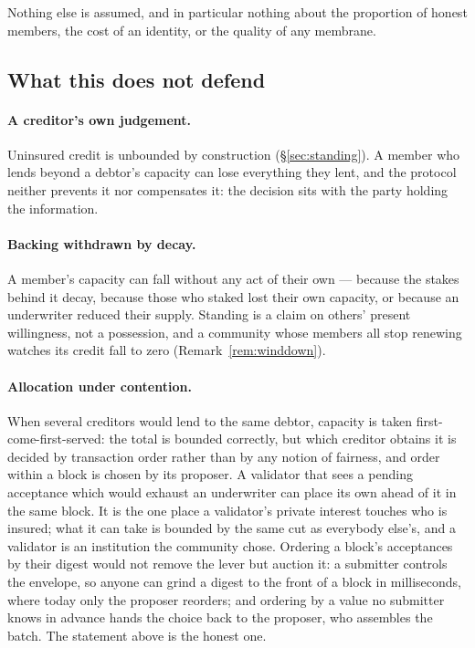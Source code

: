 Nothing else is assumed, and in particular nothing about the proportion of honest members,
the cost of an identity, or the quality of any membrane.

\subsection{What this does not defend}

\paragraph{A creditor's own judgement.} Uninsured credit is unbounded by construction
(\S\ref{sec:standing}). A member who lends beyond a debtor's capacity can lose everything
they lent, and the protocol neither prevents it nor compensates it: the decision sits with
the party holding the information.

\paragraph{Backing withdrawn by decay.} A member's capacity can fall without any act of
their own --- because the stakes behind it decay, because those who staked lost their own
capacity, or because an underwriter reduced their supply. Standing is a claim on others'
present willingness, not a possession, and a community whose members all stop renewing
watches its credit fall to zero (Remark~\ref{rem:winddown}).

\paragraph{Allocation under contention.} When several creditors would lend to the same
debtor, capacity is taken first-come-first-served: the total is bounded correctly, but
which creditor obtains it is decided by transaction order rather than by any notion of
fairness, and order within a block is chosen by its proposer. A validator that sees a
pending acceptance which would exhaust an underwriter can place its own ahead of it in the
same block. It is the one place a validator's private interest touches who is insured; what
it can take is bounded by the same cut as everybody else's, and a validator is an
institution the community chose. Ordering a block's acceptances by their digest would not
remove the lever but auction it: a submitter controls the envelope, so anyone can grind a
digest to the front of a block in milliseconds, where today only the proposer reorders;
and ordering by a value no submitter knows in advance hands the choice back to the
proposer, who assembles the batch. The statement above is the honest one.

